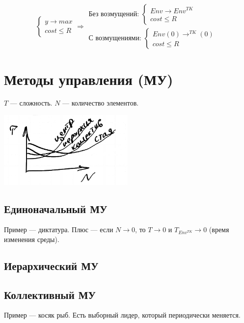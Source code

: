\documentclass[12pt]{article}
\begin{document}
\[
    \begin{cases}
        y \rightarrow max \\
        cost \leq R
    \end{cases}
    \Rightarrow
    \begin{aligned}
        \text{Без возмущений: } \begin{cases}
                                    Env \rightarrow Env^{TK} \\
                                    cost \leq R
                                \end{cases} \\
        \text{С возмущениями: } \begin{cases}
                                    Env(0) \rightarrow^{TK}(0) \\
                                    cost \leq R
                                \end{cases}
    \end{aligned}
\]

\section{Методы управления (МУ)}
$T$ — сложность.
$N$ — количество элементов.

\includegraphics[width=0.5\textwidth]{graphics/pic03.png}

\subsection{Единоначальный МУ}
Пример — диктатура. Плюс — если $N \rightarrow 0$, то $T \rightarrow 0$ и $T_{Env^{TK}} \rightarrow 0$ (время изменения среды).
\subsection{Иерархический МУ}
\subsection{Коллективный МУ}
Пример — косяк рыб. Есть выборный лидер, который периодически меняется.
\end{document}

